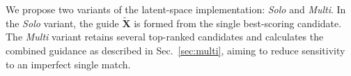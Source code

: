 \documentclass{article}
\begin{document}
We propose two variants of the latent-space implementation: \emph{Solo} and \emph{Multi}.
In the \emph{Solo} variant, the guide $\tilde{\mathbf{X}}$ is formed from the single best-scoring candidate.
The \emph{Multi} variant retains several top-ranked candidates and calculates the combined guidance as described in Sec.~\ref{sec:multi}, aiming to reduce sensitivity to an imperfect single match.




\end{document}
